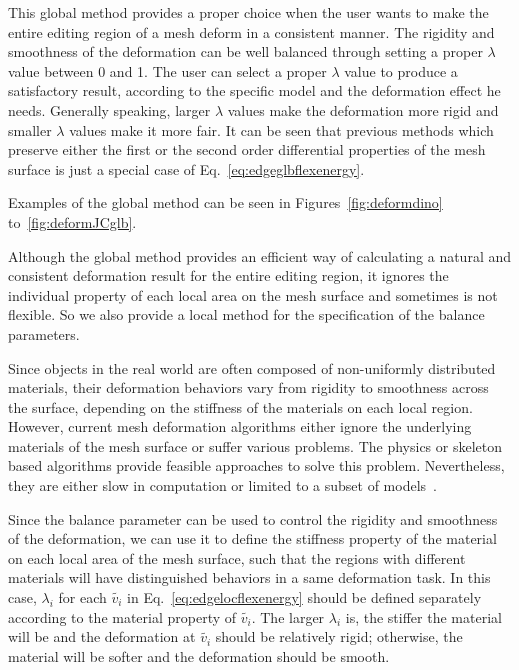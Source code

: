 This global method provides a  proper choice when the user wants to
make the entire editing region of a mesh deform in a consistent
manner. The rigidity and smoothness of the deformation can be well
balanced through setting a proper $\lambda$ value between 0 and 1.
The user can select a proper $\lambda$ value to produce a
satisfactory result, according to the specific model and the
deformation effect he needs. Generally speaking, larger $\lambda$
values make the deformation more rigid and smaller $\lambda$ values
make it more fair. It can be seen that previous methods which
preserve either the first or the second order differential
properties of the mesh surface is just a special case of
Eq.~\ref{eq:edgeglbflexenergy}.

Examples of the global method  can be seen in
Figures~\ref{fig:deformdino} to~\ref{fig:deformJCglb}.

Although the global method  provides an efficient way of calculating
a natural and consistent deformation result for the entire editing
region, it ignores the individual property of each local area on the
mesh surface and sometimes is not flexible. So we also provide a
local method for the specification of the balance parameters.

Since objects in the real world  are often composed of non-uniformly
distributed materials, their deformation behaviors vary from
rigidity to smoothness across the surface, depending on the
stiffness of the materials on each local region. However, current
mesh deformation algorithms either ignore the underlying materials
of the mesh surface or suffer various problems. The physics or
skeleton based algorithms provide feasible approaches to solve this
problem. Nevertheless, they are either slow in computation or
limited to a subset of models~\cite{PJS05}.

Since the balance parameter can be used to  control the rigidity and
smoothness of the deformation, we can use it to define the stiffness
property of the material on each local area of the mesh surface,
such that the regions with different materials will have
distinguished behaviors in a same deformation task. In this case,
$\lambda_i$ for each $\tilde{v_i}$ in Eq.~\ref{eq:edgelocflexenergy}
should be defined separately according to the material property of
$\tilde{v_i}$. The larger $\lambda_i$ is, the stiffer the material
will be and the deformation at $\tilde{v_i}$ should be relatively
rigid; otherwise, the material will be softer and the deformation
should be smooth.

